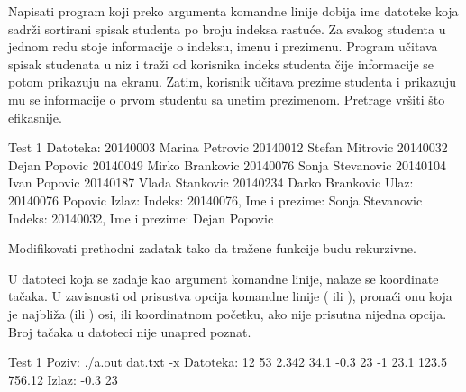 \begin{Exercise}[label=402]
  Napisati program koji preko argumenta komandne linije dobija ime
  datoteke koja sadrži sortirani spisak studenta po broju indeksa
  rastuće. Za svakog studenta u jednom redu stoje informacije o
  indeksu, imenu i prezimenu.  Program učitava spisak studenata u niz
  i traži od korisnika indeks studenta čije informacije se potom
  prikazuju na ekranu.  Zatim, korisnik učitava prezime studenta i
  prikazuju mu se informacije o prvom studentu sa unetim prezimenom.
  Pretrage vršiti što efikasnije.
  
\begin{maxitest}
\begin{test}{Test 1}
Datoteka:
20140003 Marina Petrovic
20140012 Stefan Mitrovic
20140032 Dejan Popovic
20140049 Mirko Brankovic
20140076 Sonja Stevanovic
20140104 Ivan Popovic
20140187 Vlada Stankovic
20140234 Darko Brankovic
Ulaz:
20140076
Popovic
Izlaz:
Indeks: 20140076, Ime i prezime: Sonja Stevanovic
Indeks: 20140032, Ime i prezime: Dejan Popovic
\end{test}
\end{maxitest}
  
\end{Exercise}

\begin{Exercise}[label=403]
  Modifikovati prethodni zadatak tako da tražene funkcije budu
  rekurzivne.
   
\end{Exercise}

\begin{Exercise}[label=404]
  U datoteci koja se zadaje kao argument komandne linije, nalaze se
  koordinate tačaka. U zavisnosti od prisustva opcija komandne linije
  ( ili ), pronaći onu koja je najbliža 
  (ili ) osi, ili koordinatnom početku, ako nije prisutna
  nijedna opcija. Broj tačaka u datoteci nije unapred poznat.
  
\begin{miditest}
\begin{test}{Test 1}
Poziv: ./a.out dat.txt -x
Datoteka:
12 53
2.342 34.1
-0.3 23
-1 23.1
123.5 756.12
Izlaz: -0.3 23
\end{test}
\end{miditest}
  
\end{Exercise}

